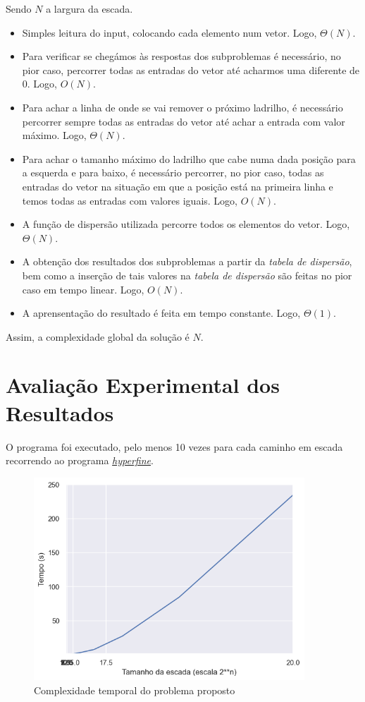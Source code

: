 \documentclass[12pt,a4paper]{article}
\begin{document}
  Sendo $N$ a largura da escada.

  \begin{itemize}
    \setlength{\itemsep}{0pt}
    \item Simples leitura do input, colocando cada elemento num vetor. Logo, $\Theta(N)$.
    \item Para verificar se chegámos às respostas dos subproblemas é necessário, no pior caso, percorrer todas as entradas do vetor até acharmos uma diferente de 0. Logo, $O(N)$.
    \item Para achar a linha de onde se vai remover o próximo ladrilho, é necessário percorrer sempre todas as entradas do vetor até achar a entrada com valor máximo. Logo, $\Theta(N)$.
    \item Para achar o tamanho máximo do ladrilho que cabe numa dada posição para a esquerda e para baixo, é necessário percorrer, no pior caso, todas as entradas do vetor na situação em que a posição está na primeira linha e temos todas as entradas com valores iguais. Logo, $O(N)$.
    \item A função de dispersão utilizada percorre todos os elementos do vetor. Logo, $\Theta(N)$.
    \item A obtenção dos resultados dos subproblemas a partir da \textit{tabela de dispersão}, bem como a inserção de tais valores na \textit{tabela de dispersão} são feitas no pior caso em tempo linear. Logo, $O(N)$.
    \item A aprensentação do resultado é feita em tempo constante. Logo, $\Theta(1)$.
  \end{itemize}

  Assim, a complexidade global da solução é $N$.

  \section{Avaliação Experimental dos Resultados}

  O programa foi executado, pelo menos 10 vezes para cada caminho em escada recorrendo ao programa \href{https://github.com/sharkdp/hyperfine}{\textit{hyperfine}}.

  \begin{figure}[H]
    \centering
    \includegraphics[width=4in]{report.png}
    \caption{Complexidade temporal do problema proposto}
    \label{fig:graphic}
  \end{figure}
\end{document}

